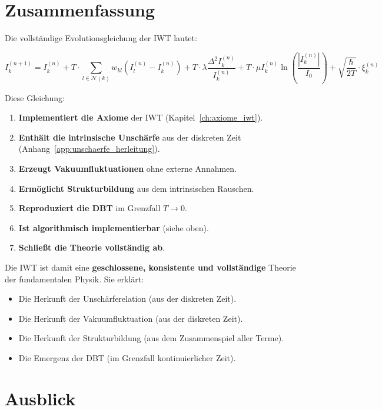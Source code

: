 \section{Zusammenfassung}
\label{app:iwt_eq_zusammenfassung}

Die vollständige Evolutionsgleichung der IWT lautet:

\[
\boxed{
I_k^{(n+1)} = I_k^{(n)} + T \cdot \sum_{l \in \mathcal{N}(k)} w_{kl} (I_l^{(n)} - I_k^{(n)})
+ T \cdot \lambda \frac{\Delta^2 I_k^{(n)}}{I_k^{(n)}}
+ T \cdot \mu I_k^{(n)} \ln\left(\frac{|I_k^{(n)}|}{I_0}\right)
+ \sqrt{\frac{\hbar}{2T}} \cdot \xi_k^{(n)}
}
\]

Diese Gleichung:

\begin{enumerate}
    \item \textbf{Implementiert die Axiome} der IWT (Kapitel~\ref{ch:axiome_iwt}).
    \item \textbf{Enthält die intrinsische Unschärfe} aus der diskreten Zeit (Anhang~\ref{app:unschaerfe_herleitung}).
    \item \textbf{Erzeugt Vakuumfluktuationen} ohne externe Annahmen.
    \item \textbf{Ermöglicht Strukturbildung} aus dem intrinsischen Rauschen.
    \item \textbf{Reproduziert die DBT} im Grenzfall \( T \to 0 \).
    \item \textbf{Ist algorithmisch implementierbar} (siehe oben).
    \item \textbf{Schließt die Theorie vollständig ab}.
\end{enumerate}

Die IWT ist damit eine \textbf{geschlossene, konsistente und vollständige} Theorie der fundamentalen Physik. Sie erklärt:

\begin{itemize}
    \item Die Herkunft der Unschärferelation (aus der diskreten Zeit).
    \item Die Herkunft der Vakuumfluktuation (aus der diskreten Zeit).
    \item Die Herkunft der Strukturbildung (aus dem Zusammenspiel aller Terme).
    \item Die Emergenz der DBT (im Grenzfall kontinuierlicher Zeit).
\end{itemize}

\section{Ausblick}
\label{app:iwt_eq_ausblick}

